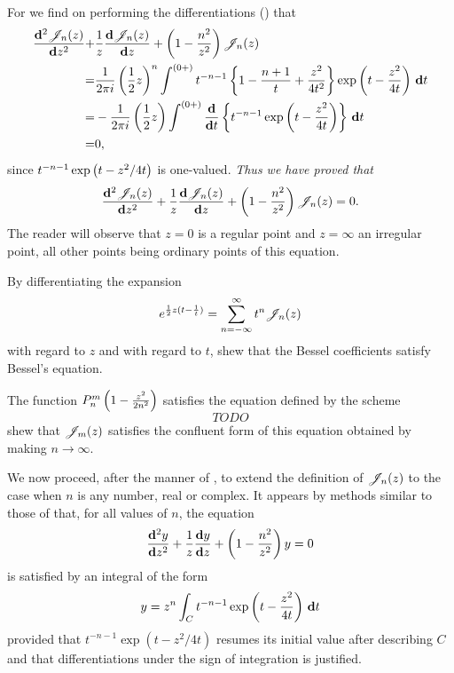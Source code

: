 For we find on performing the differentiations 
() that
\begin{align*}
  \frac{\mathbf{d}^{2} \mathscr{J}_{n}(z)}{\mathbf{d} z^{2}}
  +& \frac{1}{z} \frac{\mathbf{d} \mathscr{J}_{n}(z)}{\mathbf{d} z}
  + \left(  1 - \frac{n^{2}}{z^{2}}   \right) \mathscr{J}_{n}(z)
  \\
  =& 
  \frac{1}{2\pi i} 
  \left(  \frac{1}{2} z   \right)^{n} 
  \int^{(0+)}
  t^{-n-1}
  \left\{  1 - \frac{n+1}{t} + \frac{z^{2}}{4t^{2}}   \right\}
  \exp\left(  t - \frac{z^{2}}{4t}   \right)
  \, \mathbf{d} t \\
  =& 
  -\frac{1}{2\pi i}
  \left(  \frac{1}{2} z   \right)
  \int^{(0+)}
  \frac{\mathbf{d}}{\mathbf{d} t} \left\{  t^{-n-1} \exp\left(  t - \frac{z^{2}}{4t}   \right)
   \right\}
  \, \mathbf{d} t \\
  =& 0,
\end{align*}
since $t^{-n-1} \exp\left(  t - z^{2}/4t   \right)$ is one-valued.
\emph{Thus we have proved that }
$$
\frac{\mathbf{d}^{2} \mathscr{J}_{n}(z)}{\mathbf{d} z^{2}}
+ \frac{1}{z} \frac{\mathbf{d} \mathscr{J}_{n}(z)}{\mathbf{d} z}
+ \left(  1 - \frac{n^{2}}{z^{2}}   \right) \mathscr{J}_{n}(z) 
= 0.
$$
The reader will observe that $z=0$ is a regular point and 
$z = \infty$ an irregular point, all other points being ordinary
points of this equation.
% 
% 
\begin{wandwexample}
  By differentiating the expansion
  $$
  e^{\frac{1}{2} z (t - \frac{1}{t})} = \sum_{n=-\infty}^{\infty} t^{n} \mathscr{J}_{n}(z)
  $$
  with regard to $z$ and with regard to $t$, shew that the Bessel
  coefficients satisfy Bessel's equation.
\end{wandwexample}
\begin{wandwexample}
  The function $P_{n}^{m}\left(  1 - \frac{z^{2}}{2n^{2}}   \right)$ satisfies the
  equation defined by the scheme
  $$
  TODO
  $$
  shew that $\mathscr{J}_{m}(z)$ satisfies the confluent form of this equation
  obtained by making $n \rightarrow \infty$.
\end{wandwexample}
We now proceed, after the manner of , to
extend the definition of $\mathscr{J}_{n}(z)$ to the case when $n$ is any number,
real or complex. It appears by methods similar to those of
 that, for all values of $n$, the
equation
$$
\frac{\mathbf{d}^{2} y}{\mathbf{d} z^{2}}
+ \frac{1}{z} \frac{\mathbf{d} y}{\mathbf{d} z}
+ \left(  1 - \frac{n^{2}}{z^{2}}   \right) y
= 0
$$
is satisfied by an integral of the form
$$
y
=
z^{n}
\int_{C}
t^{-n-1}
\exp \left(  t - \frac{z^{2}}{4t}   \right)
\, \mathbf{d} t
$$
provided that $t^{-n-1}\exp(t - z^{2}/4t)$ resumes its initial value
after describing $C$ and that differentiations under the sign of
integration is justified.

